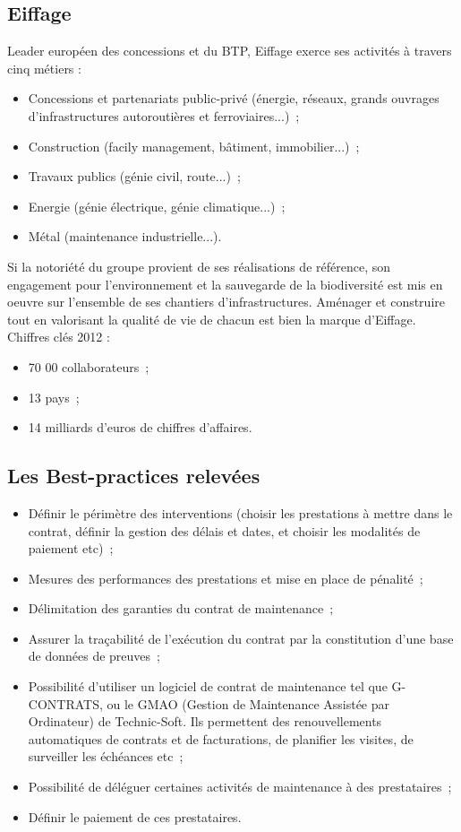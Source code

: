     \subsection{Eiffage}
    	Leader européen des concessions et du BTP, Eiffage exerce ses activités à travers cinq métiers :
        \begin{itemize}
        	\item Concessions et partenariats public-privé (énergie, réseaux, grands ouvrages d'infrastructures autoroutières et ferroviaires...)~;
        	\item Construction (facily management, bâtiment, immobilier...)~;
        	\item Travaux publics (génie civil, route...)~;
        	\item Energie (génie électrique, génie climatique...)~;
        	\item Métal (maintenance industrielle...).
        \end{itemize}
        \bigbreak
        	Si la notoriété du groupe provient de ses réalisations de référence, son engagement pour l'environnement et la sauvegarde de la biodiversité est mis en oeuvre sur l'ensemble de ses chantiers d'infrastructures. Aménager et construire tout en valorisant la qualité de vie de chacun est bien la marque d'Eiffage.
        \bigbreak
        Chiffres clés 2012 :
        \begin{itemize}
        	\item 70 00 collaborateurs~;
        	\item 13 pays~;
        	\item 14 milliards d'euros de chiffres d'affaires.
        \end{itemize}

    \subsection{Les Best-practices relevées}
        \begin{itemize}
        	\item Définir le périmètre des interventions (choisir les prestations à mettre dans le contrat, définir la gestion des délais et dates, et choisir les modalités de paiement etc)~;
        	\item Mesures des performances des prestations et mise en place de pénalité~;
        	\item Délimitation des garanties du contrat de maintenance~;
        	\item Assurer la traçabilité de l'exécution du contrat par la constitution d'une base de données de preuves~;
        	\item Possibilité d'utiliser un logiciel de contrat de maintenance tel que G-CONTRATS, ou le GMAO (Gestion de Maintenance Assistée par Ordinateur) de Technic-Soft. Ils permettent des renouvellements automatiques de contrats et de facturations, de planifier les visites, de surveiller les échéances etc~;
        	\item Possibilité de déléguer certaines activités de maintenance à des prestataires~;
        	\item Définir le paiement de ces prestataires.
        \end{itemize}

